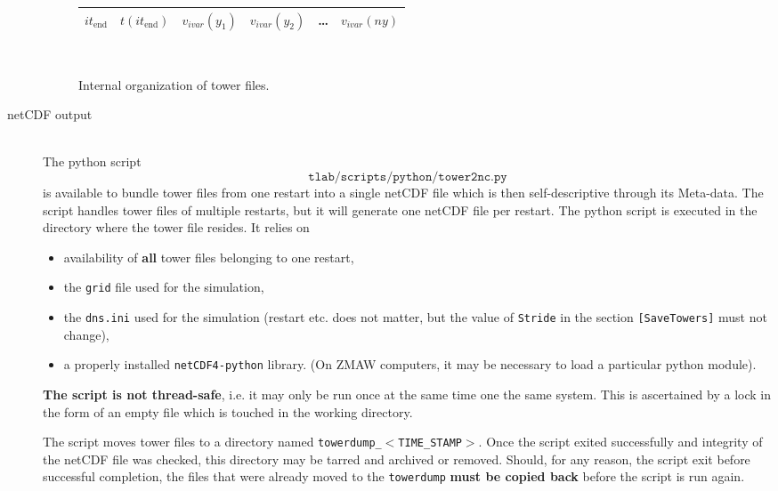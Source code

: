 \begin{description}
\begin{figure}
\begin{centering}
\begin{tabular}{| l | l | c | c | c | c | }
        $it_\mathrm{end}$   & $t(it_\mathrm{end})$ & $v_{ivar}(y_1)$ & $v_{ivar}(y_2)$ & \ldots & $v_{ivar}(ny)$ \\
        \hline
      \end{tabular}\\
    \end{centering}
  \caption{Internal organization of tower files.}
   \end{figure}
  \item[netCDF output]~ \\
    The python script \[\texttt{tlab/scripts/python/tower2nc.py}\] is available to bundle tower files from one restart into a single netCDF file which
    is then self-descriptive through its Meta-data. The script handles tower files of multiple restarts, but it will generate one netCDF file per restart.
    The python script is executed in the directory where the tower file resides.
    It relies on
    \begin{itemize}
      \item availability of \textbf{all} tower files belonging to one restart,
      \item the \texttt{grid} file used for the simulation,
      \item the \texttt{dns.ini} used for the simulation (restart etc. does not matter, but the value of \texttt{Stride}
        in the section \texttt{[SaveTowers]} must not change),
      \item a properly installed \texttt{netCDF4-python} library. (On ZMAW computers, it may be necessary to load a particular
        python module).

    \end{itemize}
    \textbf{The script is not thread-safe}, i.e. it may only be run once at the same time
    one the same system. This is ascertained by a lock in the form of an empty file which is touched
    in the working directory.
    \par
    The script moves tower files to a directory named \texttt{towerdump\_}$<$\texttt{TIME\_STAMP}$>$. Once the script
    exited successfully and integrity of the netCDF file was checked, this directory may be tarred and archived or removed.
    Should, for any reason, the script exit before successful completion, the files that were already moved to the \texttt{towerdump}
    \textbf{must be copied back} before the script is run again.
\end{description}

